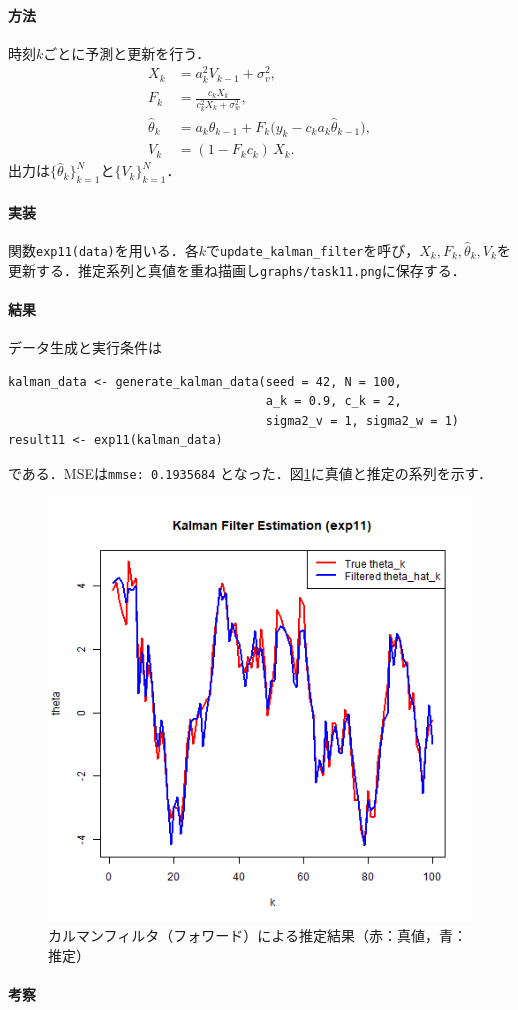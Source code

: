 \paragraph{方法}
時刻$k$ごとに予測と更新を行う．
\begin{align}
  X_k &= a_k^2 V_{k-1} + \sigma_v^2,\\
  F_k &= \frac{c_k X_k}{c_k^2 X_k + \sigma_w^2},\\
  \hat{\theta}_k &= a_k \hat{\theta}_{k-1} + F_k\bigl(y_k - c_k a_k \hat{\theta}_{k-1}\bigr),\\
  V_k &= (1 - F_k c_k)\,X_k.
\end{align}
出力は$\{\hat{\theta}_k\}_{k=1}^N$と$\{V_k\}_{k=1}^N$．

\paragraph{実装}
関数\verb|exp11(data)|を用いる．各$k$で\verb|update_kalman_filter|を呼び，$X_k, F_k, \hat{\theta}_k, V_k$を更新する．推定系列と真値を重ね描画し\verb|graphs/task11.png|に保存する．

\paragraph{結果}
データ生成と実行条件は
\begin{verbatim}
kalman_data <- generate_kalman_data(seed = 42, N = 100,
                                    a_k = 0.9, c_k = 2,
                                    sigma2_v = 1, sigma2_w = 1)
result11 <- exp11(kalman_data)
\end{verbatim}
である．MSEは\verb|mmse: 0.1935684| となった．図\ref{fig:task11_fig}に真値と推定の系列を示す．

\begin{figure}[H]
  \centering
  \includegraphics[width=0.8\linewidth]{graphs/task11.png}
  \caption{カルマンフィルタ（フォワード）による推定結果（赤：真値，青：推定）}
  \label{fig:task11_fig}
\end{figure}

\paragraph{考察}


